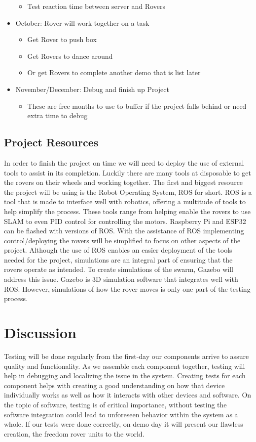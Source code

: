 \documentclass[conference]{IEEEtran}
\begin{document}
\begin{itemize}
\begin{itemize}
		\item Test reaction time between server and Rovers
	\end{itemize}
	\item October: Rover will work together on a task
	\begin{itemize}
		\item Get Rover to push box
		\item Get Rovers to dance around
		\item Or get Rovers to complete another demo that is list later
	\end{itemize}
	\item November/December: Debug and finish up Project
	\begin{itemize}
		\item These are free months to use to buffer if the project falls behind or need extra time to debug
	\end{itemize}
\end{itemize}
\subsection{Project Resources}
In order to finish the project on time we will need to deploy the use of external tools to assist in its completion. Luckily there are many tools at disposable to get the rovers on their wheels and working together. The first and biggest resource the project will be using is the Robot Operating System, ROS for short. ROS is a tool that is made to interface well with robotics, offering a multitude of tools to help simplify the process. These tools range from helping enable the rovers to use SLAM to even PID control for controlling the motors. Raspberry Pi and ESP32 can be flashed with versions of ROS. With the assistance of ROS implementing control/deploying the rovers will be simplified to focus on other aspects of the project. Although the use of ROS enables an easier deployment of the tools needed for the project, simulations are an integral part of ensuring that the rovers operate as intended. To create simulations of the swarm, Gazebo will address this issue. Gazebo is 3D simulation software that integrates well with ROS. However, simulations of how the rover moves is only one part of the testing process.

\section{Discussion}
Testing will be done regularly from the first-day our components arrive to assure quality and functionality. As we assemble each component together, testing will help in debugging and localizing the issue in the system. Creating tests for each component helps with creating a good understanding on how that device individually works as well as how it interacts with other devices and software. On the topic of software, testing is of critical importance, without testing the software integration could lead to unforeseen behavior within the system as a whole. If our tests were done correctly, on demo day it will present our flawless creation, the freedom rover units to the world.
\end{document}
